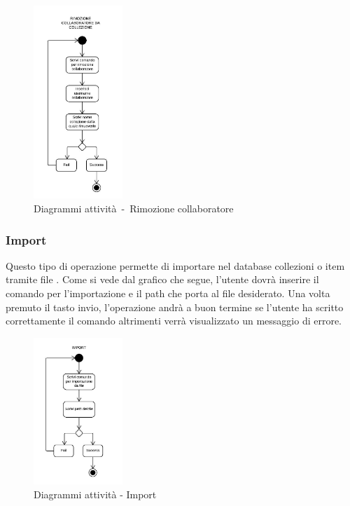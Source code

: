 \documentclass{scalatekids-article}
\begin{document}
\begin{figure}[H]
  \begin{center}
    \includegraphics[width=0.3\textwidth, keepaspectratio]{img/diagrammiAttivita/rimozioneCollaboratore.jpeg}
    \caption{Diagrammi attività\ -\ Rimozione collaboratore}
  \end{center}
\end{figure}

\subsubsection{Import}

Questo tipo di operazione permette di importare nel database collezioni o item
tramite file . Come si vede dal grafico che segue, l'utente dovrà
inserire il comando per l'importazione e il path che porta al file desiderato.
Una volta premuto il tasto invio, l'operazione andrà a buon termine se
l'utente ha scritto correttamente il comando altrimenti verrà visualizzato un
messaggio di errore.

\begin{figure}[H]
  \begin{center}
    \includegraphics[width=0.3\textwidth, keepaspectratio]{img/diagrammiAttivita/import.jpeg}
    \caption{Diagrammi attività - Import}
  \end{center}
\end{figure}
\end{document}

